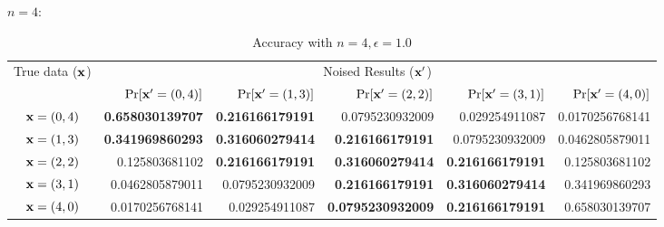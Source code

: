 \documentclass{article}
\begin{document}
\newpage
$n = 4:$
\begin{table}[htbp]
	\vspace{-0.5cm}
	\scriptsize
	\centering
	\caption{Accuracy with $n = 4, \epsilon = 1.0$}
	\label{tab_n4prob}
\begin{tabular}{|c||r|r|r|r|r|}
	\hline

	\multirow{2}{*}{True data ($\textbf{x}$)}
								& \multicolumn{5}{c|}{Noised Results ($\textbf{x}'$)}  
								\\ \cline{2-6}
	                      		&  $\Pr[\textbf{x}' = (0, 4)]$  	
	                      		&  $\Pr[\textbf{x}' = (1, 3)]$ 	
	                      		&  $\Pr[\textbf{x}' = (2, 2)]$ 	
	                      		&  $\Pr[\textbf{x}' = (3, 1)]$ 	
	                      		&  $\Pr[\textbf{x}' = (4, 0)]$ 	
	                      		\\  \hline
	                      		\hline
	$\textbf{x} = (0,4)$          & {\bf 0.658030139707}	
								& {\bf 0.216166179191}	
								&  0.0795230932009
								&  0.029254911087
								&  0.0170256768141
								\\  \hline
	$\textbf{x} = (1,3)$          & {\bf 0.341969860293}	
								& {\bf 0.316060279414}			
								& {\bf 0.216166179191}
								&  0.0795230932009
								&  0.0462805879011
								\\  \hline
	$\textbf{x} = (2,2)$          & 0.125803681102
								& {\bf 0.216166179191}			
								& {\bf 0.316060279414}
								& {\bf 0.216166179191} 
								&  0.125803681102
								\\  \hline
	$\textbf{x} = (3,1)$          & 0.0462805879011
								& 0.0795230932009 			
								& {\bf 0.216166179191}
								& {\bf 0.316060279414} 
								&  0.341969860293
								\\  \hline
	$\textbf{x} = (4,0)$          & 0.0170256768141
								& 0.029254911087 			
								& {\bf 0.0795230932009}
								& {\bf 0.216166179191} 
								&  0.658030139707
								\\  \hline
\end{tabular}
\vspace{-0.5cm}
\end{table}
\end{document}
